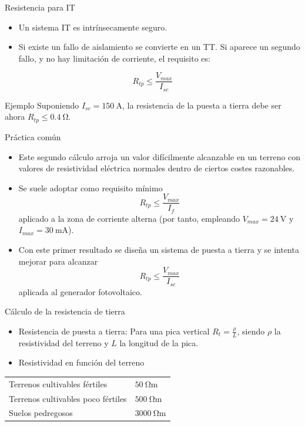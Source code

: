 \documentclass[xcolor={usenames,svgnames,dvipsnames}]{beamer}
\begin{document}
\begin{frame}[label={sec:orgaf07afc}]{Resistencia para IT}
\begin{itemize}
\item Un sistema IT es intrínsecamente seguro.
\item Si existe un fallo de aislamiento se convierte en un TT. Si aparece
un segundo fallo, y no hay limitación de corriente, el requisito es:
\end{itemize}
$$R_{tp}\leq\frac{V_{max}}{I_{sc}}$$

\begin{block}{Ejemplo}
Suponiendo \(I_{sc}=\SI{150}{\ampere}\), la resistencia de
la puesta a tierra debe ser ahora \(R_{tp}\leq\SI{0.4}{\ohm}\).
\end{block}
\end{frame}

\begin{frame}[label={sec:orgf4101c8}]{Práctica común}
\begin{itemize}
\item Este segundo cálculo arroja un \alert{valor difícilmente alcanzable} en un
terreno con valores de resistividad eléctrica normales \alert{dentro de
ciertos costes razonables}.

\item Se suele adoptar como requisito mínimo
$$R_{tp}\leq\frac{V_{max}}{I_{f}}$$ aplicado a la zona de corriente
alterna (por tanto, empleando \(V_{max}=\SI{24}{\volt}\) y
\(I_{max}=\SI{30}{\milli\ampere}\)).

\item Con este primer resultado se diseña un sistema de puesta a tierra y
se intenta mejorar para alcanzar
$$R_{tp}\leq\frac{V_{max}}{I_{sc}}$$ aplicada al generador
fotovoltaico.
\end{itemize}
\end{frame}

\begin{frame}[label={sec:org65dd506}]{Cálculo de la resistencia de tierra}
\begin{itemize}
\item \alert{Resistencia de puesta a tierra}: Para una pica vertical
\(R_{t}=\frac{\rho}{L}\), siendo \(\rho\) la resistividad del terreno y
\(L\) la longitud de la pica.

\item \alert{Resistividad en función del terreno}
\end{itemize}

\begin{center}
\begin{tabular}{ll}
Terrenos cultivables fértiles & \(\SI{50}{\ohm\meter}\)\\
Terrenos cultivables poco fértiles & \(\SI{500}{\ohm\meter}\)\\
Suelos pedregosos & \(\SI{3000}{\ohm\meter}\)\\
\end{tabular}
\end{center}
\end{frame}
\end{document}
